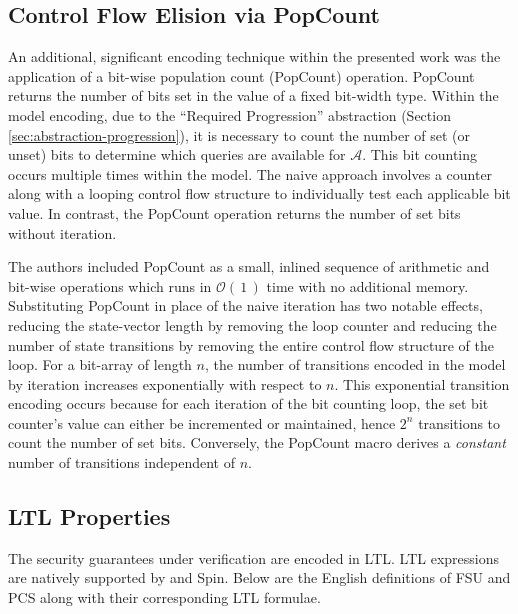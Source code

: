 \documentclass[runningheads]{llncs}
\newcommand{\Abrev}[1]{\gls{#1}}
\newcommand{\Adversary}{\ensuremath{\mathcal{A}}\xspace}
\newcommand{\BigO}[1]{\ensuremath{\mathcal{O}\left(\,#1\,\right)}\xspace}
\begin{document}
\subsection{Control Flow Elision via PopCount\label{sec:popcount}}

An additional, significant \Promela encoding technique within the presented work was the application of a bit-wise population count (PopCount) operation.
PopCount returns the number of bits set in the value of a fixed bit-width type.
Within the model encoding, due to the ``Required Progression''  abstraction (Section \ref{sec:abstraction-progression}), it is necessary to count the number of set (or unset) bits to determine which queries are available for \Adversary.
This bit counting occurs multiple times within the model.
The naive approach involves a counter along with a looping control flow structure to individually test each applicable bit value.
In contrast, the PopCount operation returns the number of set bits without iteration.

The authors included PopCount as a small, inlined sequence of arithmetic and bit-wise operations which runs in \BigO{1} time with no additional memory.
Substituting PopCount in place of the naive iteration has two notable effects, reducing the state-vector length by removing the loop counter and reducing the number of state transitions by removing the entire control flow structure of the loop.
For a bit-array of length $n$, the number of transitions encoded in the model by iteration increases exponentially with respect to $n$. This exponential transition encoding occurs because for each iteration of the bit counting loop, the set bit counter's value can either be incremented or maintained, hence $2^{n}$ transitions to count the number of set bits.
Conversely, the PopCount macro derives a \emph{constant} number of transitions independent of $n$.

\newcommand{\UnderNote}[1]{%
{\textit{\textsf{\guillemotleft#1\guillemotright}}}%
}
\newcommand{\UnderNoteRef}[1]{%
\,\raisebox{0.15em}{\scalebox{0.65}{\UnderNote{#1}}}%
}

\newcommand{\TermLTL}[1]{{\small{\texttt{#1}}}}


\subsection{LTL Properties}

The security guarantees under verification are encoded in \Abrev{LTL}.
\Abrev{LTL} expressions are natively supported by \Promela and Spin.
Below are the English definitions of \Abrev{FSU} and \Abrev{PCS} along with their corresponding \Abrev{LTL} formulae.
\end{document}
